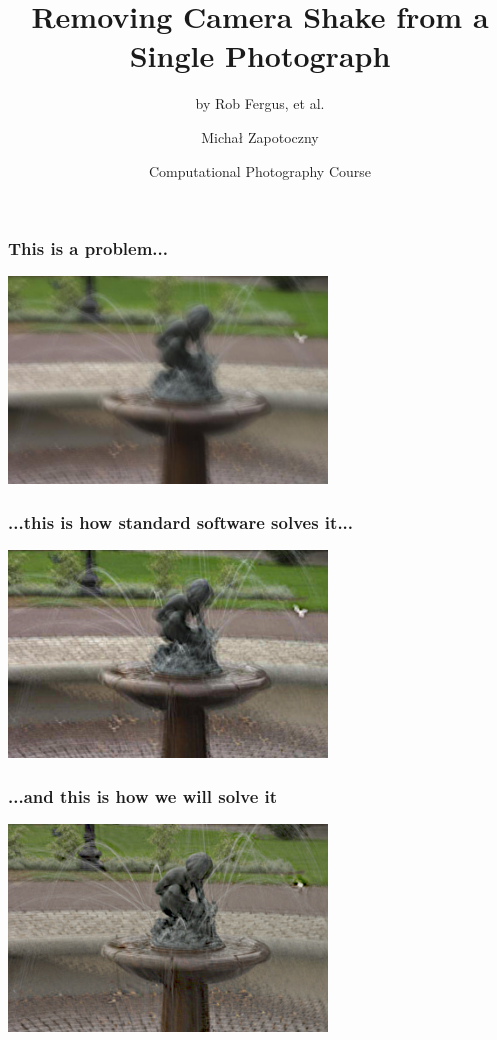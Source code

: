\documentclass{beamer}
\title 
{Removing Camera Shake from a Single Photograph}
\subtitle{by Rob Fergus, et al.}
\author %
{Michał Zapotoczny}
\institute 
{
  Instytut Informatyki \\
  Uniwersytet Wrocławski
}
\date
{Computational Photography Course}
\begin{document}
\frame{\titlepage}

\begin{frame}
    \frametitle{This is a problem...}
    \begin{center}
        \includegraphics[width=240pt]{img/img-000.png}
    \end{center}
\end{frame}
\begin{frame}
    \frametitle{...this is how standard software solves it...}
    \begin{center}
        \includegraphics[width=240pt]{img/img-001.png}
    \end{center}
\end{frame}
\begin{frame}
    \frametitle{...and this is how we will solve it}
    \begin{center}
        \includegraphics[width=240pt]{img/img-002.png}
    \end{center}
\end{frame}
\end{document}
